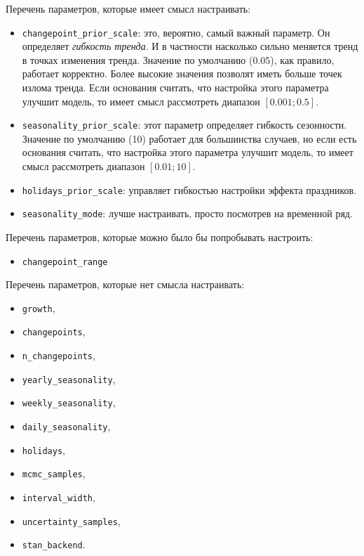 \documentclass[%
	11pt,
	a4paper,
	utf8,
		]{article}
\begin{document}
Перечень параметров, которые имеет смысл настраивать:
\begin{itemize}
	\item \texttt{changepoint\_prior\_scale}: это, вероятно, самый важный параметр. Он определяет \emph{гибкость тренда}. И в частности насколько сильно меняется тренд в точках изменения тренда. Значение по умолчанию (0.05), как правило, работает корректно. Более высокие значения позволят иметь больше точек излома тренда. Если основания считать, что настройка этого параметра улучшит модель, то имеет смысл рассмотреть диапазон $ [0.001; 0.5] $.
	
	\item \texttt{seasonality\_prior\_scale}: этот параметр определяет гибкость сезонности. Значение по умолчанию (10) работает для большинства случаев, но если есть основания считать, что настройка этого параметра улучшит модель, то имеет смысл рассмотреть диапазон $ [0.01; 10] $.
	
	\item \texttt{holidays\_prior\_scale}: управляет гибкостью настройки эффекта праздников.
	
	\item \texttt{seasonality\_mode}: лучше настраивать, просто посмотрев на временной ряд.
\end{itemize}

Перечень параметров, которые можно было бы попробывать настроить:
\begin{itemize}
	\item \texttt{changepoint\_range}
\end{itemize}

Перечень параметров, которые нет смысла настраивать:
\begin{itemize}
	\item \texttt{growth},
	
	\item \texttt{changepoints},
	
	\item \texttt{n\_changepoints},
	
	\item \texttt{yearly\_seasonality},
	
	\item \texttt{weekly\_seasonality},
	
	\item \texttt{daily\_seasonality},
	
	\item \texttt{holidays},
	
	\item \texttt{mcmc\_samples},
	
	\item \texttt{interval\_width},
	
	\item \texttt{uncertainty\_samples},
	
	\item \texttt{stan\_backend}.
\end{itemize}
\end{document}

